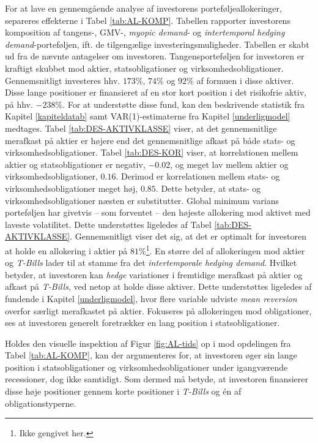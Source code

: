 \documentclass[
  a4paper,
  oneside]{memoir}
\begin{document}
For at lave en gennemgående analyse af investorens porteføljeallokeringer, separeres effekterne i Tabel \ref{tab:AL-KOMP}. Tabellen rapporter investorens komposition af tangens-, GMV-, \emph{myopic demand}- og \emph{intertemporal hedging demand}-porteføljen, ift. de tilgengælige investeringsmuligheder. Tabellen er skabt ud fra de nævnte antagelser om investoren. Tangensporteføljen for investoren er kraftigt skubbet mod aktier, statsobligationer og virksomhedsobligationer. Gennemsnitligt investeres hhv. \(173 \%\), \(74\%\) og \(92\%\) af formuen i disse aktiver. Disse lange positioner er finansieret af en stor kort position i det risikofrie aktiv, på hhv. \(-238\%\). For at understøtte disse fund, kan den beskrivende statistik fra Kapitel \ref{kapiteldatab} samt VAR(1)-estimaterne fra Kapitel \ref{underligmodel} medtages. Tabel \ref{tab:DES-AKTIVKLASSE} viser, at det gennemsnitlige merafkast på aktier er højere end det gennemsnitlige afkast på både stats- og virksomhedsobligationer. Tabel \ref{tab:DES-KOR} viser, at korrelationen mellem aktier og statsobligationer er negativ, \(-0.02\), og meget lav mellem aktier og virksomhedsobligationer, \(0.16\). Derimod er korrelationen mellem stats- og virksomhedsobligationer meget høj, \(0.85\). Dette betyder, at stats- og virksomhedsobligationer næsten er substitutter. Global minimum varians porteføljen har givetvis -- som forventet -- den højeste allokering mod aktivet med laveste volatilitet. Dette understøttes ligeledes af Tabel \ref{tab:DES-AKTIVKLASSE}. Gennemsnitligt viser det sig, at det er optimalt for investoren at holde en allokering i aktier på \(81\%\)\footnote{Ikke gengivet her.}. En større del af allokeringen mod aktier og \emph{T-Bills} lader til at stamme fra det \emph{intertemporale hedging demand}. Hvilket betyder, at investoren kan \emph{hedge} variationer i fremtidige merafkast på aktier og afkast på \emph{T-Bills}, ved netop at holde disse aktiver. Dette understøttes ligeledes af fundende i Kapitel \ref{underligmodel}, hvor flere variable udviste \emph{mean reversion} overfor særligt merafkastet på aktier. Fokuseres på allokeringen mod obligationer, ses at investoren generelt foretrækker en lang position i statsobligationer.

Holdes den visuelle inspektion af Figur \ref{fig:AL-tids} op i mod opdelingen fra Tabel \ref{tab:AL-KOMP}, kan der argumenteres for, at investoren øger sin lange position i statsobligationer og virksomhedsobligationer under igangværende recessioner, dog ikke samtidigt. Som dermed må betyde, at investoren finansierer disse høje positioner gennem korte positioner i \emph{T-Bills} og én af obligationstyperne.
\end{document}

